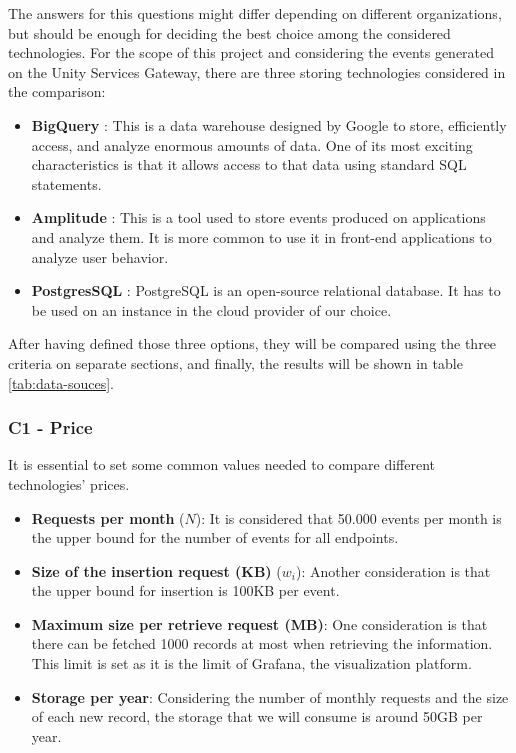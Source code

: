 \documentclass[english, 12pt, a4paper, sci, utf8, a-1b, online]{aaltothesis}
\begin{document}
The answers for this questions might differ depending on different organizations, but should be enough for deciding the best choice among the considered technologies. For the scope of this project and considering the events generated on the Unity Services Gateway, there are three storing technologies considered in the comparison:

\begin{itemize}
    \item \textbf{BigQuery} \cite{BigQuery}: This is a data warehouse designed by Google to store, efficiently access, and analyze enormous amounts of data. One of its most exciting characteristics is that it allows access to that data using standard SQL statements.
    \item \textbf{Amplitude} \cite{Amplitude}: This is a tool used to store events produced on applications and analyze them. It is more common to use it in front-end applications to analyze user behavior.
    \item \textbf{PostgresSQL} \cite{PostgreSQL}: PostgreSQL is an open-source relational database. It has to be used on an instance in the cloud provider of our choice.
\end{itemize}

After having defined those three options, they will be compared using the three criteria on separate sections, and finally, the results will be shown in table \ref{tab:data-souces}.

\subsubsection*{C1 - Price}

It is essential to set some common values needed to compare different technologies' prices.

\begin{itemize}
    \item \textbf{Requests per month} ($N$): It is considered that 50.000 events per month is the upper bound for the number of events for all endpoints.
    \item \textbf{Size of the insertion request (KB)} ($w_i$): Another consideration is that the upper bound for insertion is 100KB per event.
    \item \textbf{Maximum size per retrieve request (MB)}: One consideration is that there can be fetched 1000 records at most when retrieving the information. This limit is set as it is the limit of Grafana, the visualization platform.
    \item \textbf{Storage per year}: Considering the number of monthly requests and the size of each new record, the storage that we will consume is around 50GB per year.
\end{itemize}
\end{document}
